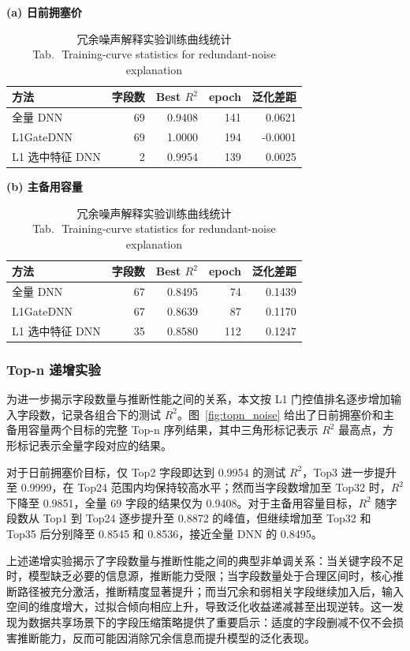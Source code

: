 \documentclass[UTF8,zihao=5,twoside]{ctexart}
\numberwithin{equation}{section}
\newcommand{\tabbicaption}[2]{%
  \caption{#1\\[-0.2em]\small Tab.\,\thetable\ #2}
}
\begin{document}
\begin{table}[!tbp]
\centering
\scriptsize
\setlength{\tabcolsep}{3pt}
\tabbicaption{冗余噪声解释实验训练曲线统计}{Training-curve statistics for redundant-noise explanation}
\label{tab:noise_curve}
\textbf{(a) 日前拥塞价}\\[-0.2em]
\begin{tabularx}{\columnwidth}{Xrrrr}
\toprule
方法 & 字段数 & Best $R^2$ & epoch & 泛化差距 \\
\midrule
全量 DNN & 69 & 0.9408 & 141 & 0.0621 \\
L1GateDNN & 69 & 1.0000 & 194 & -0.0001 \\
L1 选中特征 DNN & 2 & 0.9954 & 139 & 0.0025 \\
\bottomrule
\end{tabularx}

\vspace{0.4em}
\textbf{(b) 主备用容量}\\[-0.2em]
\begin{tabularx}{\columnwidth}{Xrrrr}
\toprule
方法 & 字段数 & Best $R^2$ & epoch & 泛化差距 \\
\midrule
全量 DNN & 67 & 0.8495 & 74 & 0.1439 \\
L1GateDNN & 67 & 0.8639 & 87 & 0.1170 \\
L1 选中特征 DNN & 35 & 0.8580 & 112 & 0.1247 \\
\bottomrule
\end{tabularx}
\end{table}

\subsubsection{Top-n 递增实验}
为进一步揭示字段数量与推断性能之间的关系，本文按 L1 门控值排名逐步增加输入字段数，记录各组合下的测试 $R^2$。图~\ref{fig:topn_noise} 给出了日前拥塞价和主备用容量两个目标的完整 Top-n 序列结果，其中三角形标记表示 $R^2$ 最高点，方形标记表示全量字段对应的结果。

对于日前拥塞价目标，仅 Top2 字段即达到 0.9954 的测试 $R^2$，Top3 进一步提升至 0.9999，在 Top24 范围内均保持较高水平；然而当字段数增加至 Top32 时，$R^2$ 下降至 0.9851，全量 69 字段的结果仅为 0.9408。对于主备用容量目标，$R^2$ 随字段数从 Top1 到 Top24 逐步提升至 0.8872 的峰值，但继续增加至 Top32 和 Top35 后分别降至 0.8545 和 0.8536，接近全量 DNN 的 0.8495。

上述递增实验揭示了字段数量与推断性能之间的典型非单调关系：当关键字段不足时，模型缺乏必要的信息源，推断能力受限；当字段数量处于合理区间时，核心推断路径被充分激活，推断精度显著提升；而当冗余和弱相关字段继续加入后，输入空间的维度增大，过拟合倾向相应上升，导致泛化收益递减甚至出现逆转。这一发现为数据共享场景下的字段压缩策略提供了重要启示：适度的字段删减不仅不会损害推断能力，反而可能因消除冗余信息而提升模型的泛化表现。
\end{document}
